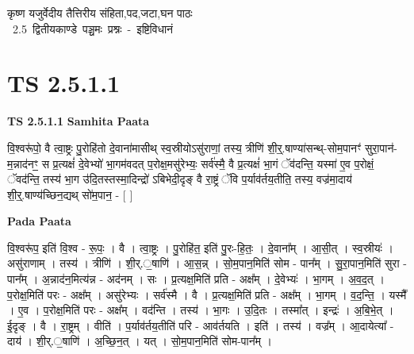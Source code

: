 \documentclass[17pt]{extarticle}
\begin{document}
\begin{titlepage}
    \begin{center}
 
\begin{sanskrit}
    { \Large
    कृष्ण यजुर्वेदीय तैत्तिरीय संहिता,पद,जटा,घन पाठः 
    }
    \\
    \vspace{2.5cm}
    \mbox{ \Large
    2.5      द्वितीयकाण्डे पञ्चमः प्रश्नः - इष्टिविधानं   }
\end{sanskrit}
\end{center}

\end{titlepage}
\tableofcontents
{}
\pagebreak


\section{ TS 2.5.1.1 }

\textbf{TS 2.5.1.1 } \newline
\textbf{Samhita Paata} \newline

वि॒श्वरू॑पो॒ वै त्वा॒ष्ट्रः पु॒रोहि॑तो दे॒वाना॑मासीथ् स्व॒स्रीयोऽसु॑राणां॒ तस्य॒ त्रीणि॑ शी॒र्॒.षाण्या॑सन्थ्-सोम॒पानꣳ॑ सुरा॒पान॑-म॒न्नाद॑नꣳ॒॒ स प्र॒त्यक्षं॑ दे॒वेभ्यो॑ भा॒गम॑वदत् प॒रोक्ष॒मसु॑रेभ्यः॒ सर्व॑स्मै॒ वै प्र॒त्यक्षं॑ भा॒गं ॅव॑दन्ति॒ यस्मा॑ ए॒व प॒रोक्षं॒ ॅवद॑न्ति॒ तस्य॑ भा॒ग उ॑दि॒तस्तस्मा॒दिन्द्रो॑ ऽबिभेदी॒दृङ् वै रा॒ष्ट्रं ॅवि प॒र्याव॑र्तय॒तीति॒ तस्य॒ वज्र॑मा॒दाय॑ शी॒र्॒.षाण्य॑च्छिन॒द्यथ् सो॑म॒पान॒ - [  ] \newline

\textbf{Pada Paata} \newline

वि॒श्वरू॑प॒ इति॑ वि॒श्व - रू॒पः॒ । वै । त्वा॒ष्ट्रः । पु॒रोहि॑त॒ इति॑ पु॒रः-हि॒तः॒ । दे॒वाना᳚म् । आ॒सी॒त् । स्व॒स्रीयः॑ । असु॑राणाम् । तस्य॑ । त्रीणि॑ । शी॒र्.॒षाणि॑ । आ॒स॒न्न् । सो॒म॒पान॒मिति॑ सोम - पान᳚म् । सु॒रा॒पान॒मिति॑ सुरा - पान᳚म् । अ॒न्नाद॑न॒मित्य॑न्न - अद॑नम् । सः । प्र॒त्यक्ष॒मिति॑ प्रति - अक्ष᳚म् । दे॒वेभ्यः॑ । भा॒गम् । अ॒व॒द॒त् । प॒रोक्ष॒मिति॑ परः - अक्ष᳚म् । असु॑रेभ्यः । सर्व॑स्मै । वै । प्र॒त्यक्ष॒मिति॑ प्रति - अक्ष᳚म् । भा॒गम् । व॒द॒न्ति॒ । यस्मै᳚ । ए॒व । प॒रोक्ष॒मिति॑ परः - अक्ष᳚म् । वद॑न्ति । तस्य॑ । भा॒गः । उ॒दि॒तः । तस्मा᳚त् । इन्द्रः॑ । अ॒बि॒भे॒त् । ई॒दृङ् । वै । रा॒ष्ट्रम् । वीति॑ । प॒र्याव॑र्तय॒तीति॑ परि - आव॑र्तयति । इति॑ । तस्य॑ । वज्र᳚म् । आ॒दायेत्या᳚ - दाय॑ । शी॒र्.॒षाणि॑ । अ॒च्छि॒न॒त् । यत् । सो॒म॒पान॒मिति॑ सोम-पान᳚म् ।  \newline
\end{document}
